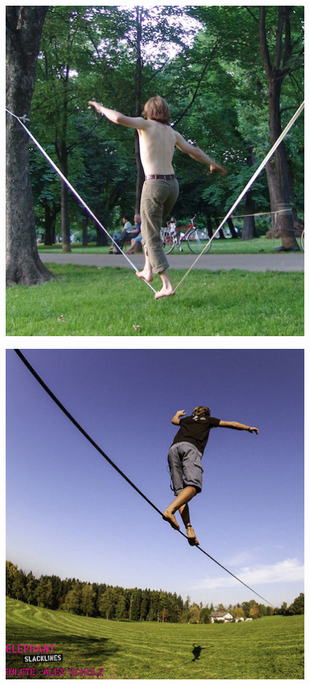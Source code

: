 \begin{figure}[htb]
\begin{minipage}[t]{0.45\linewidth}
		\label{fig:jumpline}
	\end{minipage}
	\hfill
	\begin{minipage}[t]{0.45\linewidth}
		\centering
		\includegraphics[width=1\linewidth]{Pictures/3_1_rodeoline}
		\label{fig:rodeoline}
	\end{minipage}
	\hfill
	\begin{minipage}[t]{0.45\linewidth}
		\centering
		\includegraphics[width=1\linewidth]{Pictures/3_1_longline1}

\end{minipage}
\end{figure}
